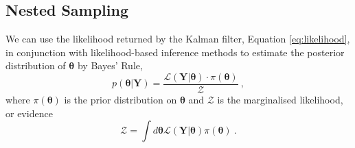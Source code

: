 \documentclass[fleqn,usenatbib,useAMS]{mnras}
\begin{document}
\subsection{Nested Sampling}\label{sec:nested_sampling}
We can use the likelihood returned by the Kalman filter, Equation \eqref{eq:likelihood}, in conjunction with likelihood-based inference methods to estimate the posterior distribution of $\boldsymbol{\theta}$ by Bayes' Rule,
\begin{equation}
	p(\boldsymbol{\theta} | \boldsymbol{Y}) = \frac{\mathcal{L}(\boldsymbol{Y} | \boldsymbol{\theta}) \cdot \pi(\boldsymbol{\theta})}{\mathcal{Z}} \ ,
\end{equation}
where $\pi(\boldsymbol{\theta})$ is the prior distribution on $\boldsymbol{\theta}$ and $\mathcal{Z}$ is the marginalised likelihood, or evidence
\begin{equation}
	\mathcal{Z} = \int d \boldsymbol{\theta} \mathcal{L}(\boldsymbol{Y} | \boldsymbol{\theta})  \pi(\boldsymbol{\theta})  \ . \label{eq:model_evidence}
\end{equation}
\end{document}

